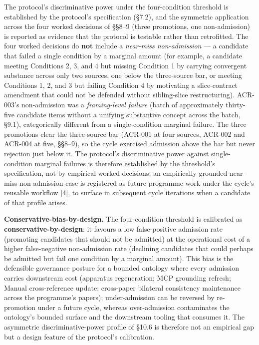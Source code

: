 \documentclass[
]{article}
\begin{document}
The protocol's discriminative power under the four-condition threshold
is established by the protocol's specification (§7.2), and the symmetric
application across the four worked decisions of §§8--9 (three
promotions, one non-admission) is reported as evidence that the protocol
is testable rather than retrofitted. The four worked decisions do
\textbf{not} include a \emph{near-miss non-admission} --- a candidate
that failed a single condition by a marginal amount (for example, a
candidate meeting Conditions 2, 3, and 4 but missing Condition 1 by
carrying convergent substance across only two sources, one below the
three-source bar, or meeting Conditions 1, 2, and 3 but failing
Condition 4 by motivating a slice-contract amendment that could not be
defended without sibling-slice restructuring). ACR-003's non-admission
was a \emph{framing-level failure} (batch of approximately thirty-five
candidate items without a unifying substantive concept across the batch,
§9.1), categorically different from a single-condition marginal failure.
The three promotions clear the three-source bar (ACR-001 at four
sources, ACR-002 and ACR-004 at five, §§8--9), so the cycle exercised
admission above the bar but never rejection just below it. The
protocol's discriminative power against single-condition marginal
failures is therefore established by the threshold's specification, not
by empirical worked decisions; an empirically grounded near-miss
non-admission case is registered as future programme work under the
cycle's reusable workflow {[}4{]}, to surface in subsequent cycle
iterations when a candidate of that profile arises.

\textbf{Conservative-bias-by-design.} The four-condition threshold is
calibrated as \textbf{conservative-by-design}: it favours a low
false-positive admission rate (promoting candidates that should not be
admitted) at the operational cost of a higher false-negative
non-admission rate (declining candidates that could perhaps be admitted
but fail one condition by a marginal amount). This bias is the
defensible governance posture for a bounded ontology where every
admission carries downstream cost (apparatus regeneration; MCP grounding
refresh; Manual cross-reference update; cross-paper bilateral
consistency maintenance across the programme's papers); under-admission
can be reversed by re-promotion under a future cycle, whereas
over-admission contaminates the ontology's bounded surface and the
downstream tooling that consumes it. The asymmetric discriminative-power
profile of §10.6 is therefore not an empirical gap but a design feature
of the protocol's calibration.
\end{document}
